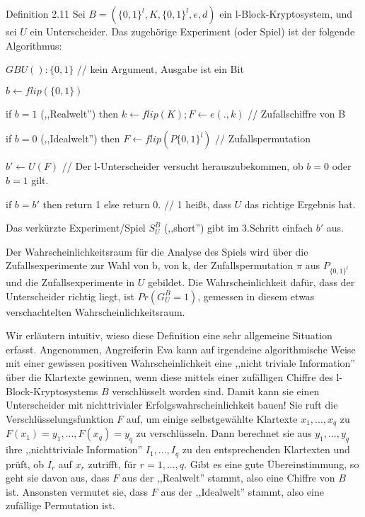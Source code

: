 \documentclass[a4paper]{article}
\begin{document}
\begin{multicols}{3}
    Definition 2.11 Sei $B=(\{0,1\}^l,K,\{0,1\}^l,e,d)$ ein l-Block-Kryptosystem, und sei $U$ ein Unterscheider. Das zugehörige Experiment (oder Spiel) ist der folgende Algorithmus:
    \begin{itemize*}
        \item $GBU():\{0,1\}$ // kein Argument, Ausgabe ist ein Bit
        \begin{enumerate*}
            \item $b\leftarrow flip(\{0,1\})$
            \begin{itemize*}
                \item if $b=1$ (,,Realwelt'') then $k\leftarrow flip(K);F\leftarrow e(.,k)$ // Zufallschiffre von B
                \item if $b=0$ (,,Idealwelt'') then $F\leftarrow flip(P\{0,1\}^l)$ // Zufallspermutation
            \end{itemize*}
            \item  $b'\leftarrow U(F)$  // Der l-Unterscheider versucht herauszubekommen, ob $b=0$ oder $b=1$ gilt.
            \item  if $b=b'$ then return 1 else return 0.     // 1 heißt, dass $U$ das richtige Ergebnis hat.
        \end{enumerate*}
    \end{itemize*}

    Das verkürzte Experiment/Spiel $S^B_U$ (,,short'') gibt im 3.Schritt einfach $b'$ aus.

    Der Wahrscheinlichkeitsraum für die Analyse des Spiels wird über die Zufallsexperimente zur Wahl von b, von k, der Zufallspermutation $\pi$ aus $P_{\{0,1\}^l}$ und die Zufallsexperimente in $U$ gebildet. Die Wahrscheinlichkeit dafür, dass der Unterscheider richtig liegt, ist $Pr(G^B_U=1)$, gemessen in diesem etwas verschachtelten Wahrscheinlichkeitsraum.

    Wir erläutern intuitiv, wieso diese Definition eine sehr allgemeine Situation erfasst. Angenommen, Angreiferin Eva kann auf irgendeine algorithmische Weise mit einer gewissen positiven Wahrscheinlichkeit eine ,,nicht triviale Information'' über die Klartexte gewinnen, wenn diese mittels einer zufälligen Chiffre des l-Block-Kryptosystems $B$ verschlüsselt worden sind. Damit kann sie einen Unterscheider mit nichttrivialer Erfolgswahrscheinlichkeit bauen! Sie ruft die Verschlüsselungsfunktion $F$ auf, um einige selbstgewählte Klartexte $x_1,...,x_q$ zu $F(x_1)=y_1,...,F(x_q)=y_q$ zu verschlüsseln. Dann berechnet sie aus $y_1,...,y_q$ ihre ,,nichttriviale Information'' $I_1,...,I_q$ zu den entsprechenden Klartexten und prüft, ob $I_r$ auf $x_r$ zutrifft, für $r=1,...,q$. Gibt es eine gute Übereinstimmung, so geht sie davon aus, dass $F$ aus der ,,Realwelt'' stammt, also eine Chiffre von $B$ ist. Ansonsten vermutet sie, dass $F$ aus der ,,Idealwelt'' stammt, also eine zufällige Permutation ist.


\end{multicols}
\end{document}
